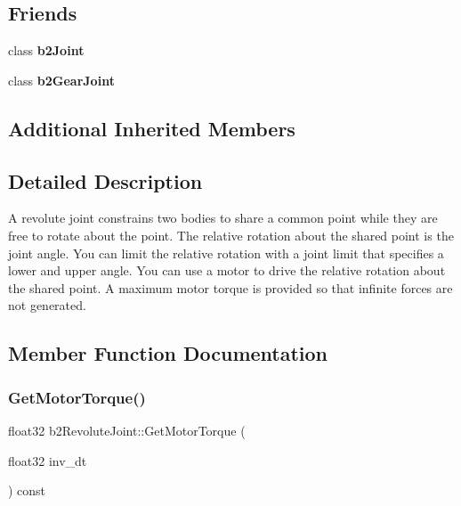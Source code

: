 \subsection*{Friends}
\begin{DoxyCompactItemize}
\item 
\mbox{\label{classb2RevoluteJoint_a2f8aeb7f12b8fbe115431953a4926eed}} 
class {\bfseries b2\+Joint}
\item 
\mbox{\label{classb2RevoluteJoint_ad10f779c9d5766655fce7233bbc4a554}} 
class {\bfseries b2\+Gear\+Joint}
\end{DoxyCompactItemize}
\subsection*{Additional Inherited Members}


\subsection{Detailed Description}
A revolute joint constrains two bodies to share a common point while they are free to rotate about the point. The relative rotation about the shared point is the joint angle. You can limit the relative rotation with a joint limit that specifies a lower and upper angle. You can use a motor to drive the relative rotation about the shared point. A maximum motor torque is provided so that infinite forces are not generated. 

\subsection{Member Function Documentation}
\mbox{\label{classb2RevoluteJoint_a5abafb4d0c1df642f73a5d9faf615e26}} 
\subsubsection{\texorpdfstring{Get\+Motor\+Torque()}{GetMotorTorque()}\hspace{0.1cm}{\footnotesize\ttfamily [1/2]}}
{\footnotesize\ttfamily float32 b2\+Revolute\+Joint\+::\+Get\+Motor\+Torque (\begin{DoxyParamCaption}\item[{float32}]{inv\+\_\+dt }\end{DoxyParamCaption}) const}


